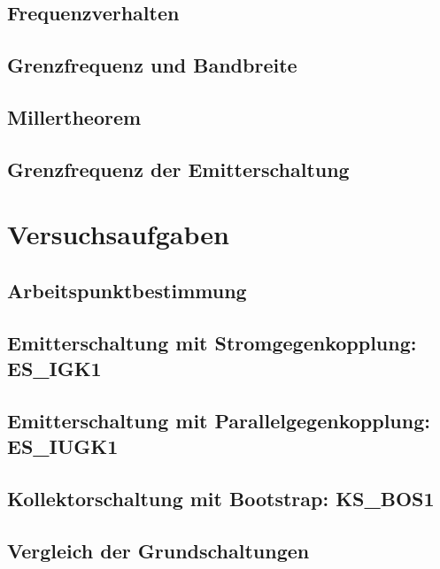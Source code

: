 \documentclass[a4paper, 12pt]{article}
\begin{document}
\subsection{Frequenzverhalten}


\subsection{Grenzfrequenz und Bandbreite}


\subsection{Millertheorem}


\subsection{Grenzfrequenz der Emitterschaltung}


  
  \clearpage
  \setcounter{page}{1}

\section{Versuchsaufgaben} 

\setcounter{subsection}{1}
\subsection{Arbeitspunktbestimmung}


\subsection{Emitterschaltung mit Stromgegenkopplung: ES\_IGK1}


\subsection{Emitterschaltung mit Parallelgegenkopplung: ES\_IUGK1}


\subsection{Kollektorschaltung mit Bootstrap: KS\_BOS1}


\subsection{Vergleich der Grundschaltungen}

\end{document}
